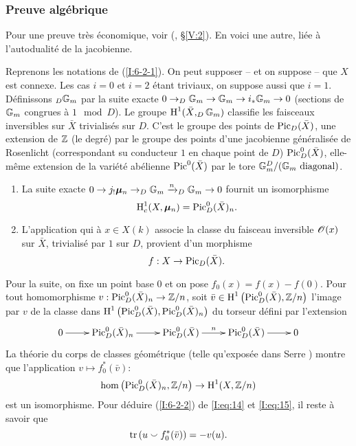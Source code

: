 \documentclass[oneside]{book}
\begin{document}
\subsubsection{Preuve algébrique}\label{I:6-2-3}

Pour une preuve très économique, voir (, \S\ref{V:2}). 
En voici une autre, liée à l'autodualité de la jacobienne. 

Reprenons les notations de (\ref{I:6-2-1}). On peut supposer -- et on suppose -- 
que $X$ est connexe. Les cas $i=0$ et $i=2$ étant triviaux, on suppose aussi 
que $i=1$. Définissons $_D\mathbb{G}_m$ par la suite exacte 
$0\to _D\mathbb{G}_m \to \mathbb{G}_m \to i_*\mathbb{G}_m\to 0$ (sections de $\mathbb{G}_m$ congrues à 
$1\mod D$). Le groupe $\operatorname{H}^1(\bar X, _D\mathbb{G}_m)$ classifie les faisceaux 
inversibles sur $\bar X$ trivialisés sur $D$. C'est le groupe des points de 
$\operatorname{Pic}_D(\bar X)$, une extension de $\mathbb{Z}$ (le degré) par le groupe des points 
d'une jacobienne généralisée de Rosenlicht (correspondant su conducteur 
$1$ en chaque point de $D$) $\operatorname{Pic}_D^0(\bar X)$, elle-même extension de la 
variété abélienne $\operatorname{Pic}^0(\bar X)$ par le tore 
$\mathbb{G}_m^D/(\text{$\mathbb{G}_m$ diagonal})$. 

\begin{enumerate}[\indent a)]
  \item La suite exacte 
    $0\to j_!{\bm\mu}_n \to _D\mathbb{G}_m \xrightarrow{n} _D\mathbb{G}_m\to 0$ fournit un 
    isomorphisme 
    \begin{equation}\label{I:eq:14}
      \operatorname{H}_c^1(X,{\bm\mu}_n) = \operatorname{Pic}_D^0(\bar X)_n \text{.}
    \end{equation}
  \item L'application qui à $x\in X(k)$ associe la classe du faisceau 
    inversible $\mathscr{O}(x)$ sur $\bar X$, trivialisé par $1$ sur $D$, provient 
    d'un morphisme 
    \[
      f:X \to \operatorname{Pic}_D(\bar X) \text{.}
    \]
\end{enumerate}
Pour la suite, on fixe un point base $0$ et on pose $f_0(x)=f(x)-f(0)$. Pour 
tout homomorphisme $v:\operatorname{Pic}_D^0(\bar X)_n \to \mathbb{Z}/n$, soit 
$\bar v\in \operatorname{H}^1\left(\operatorname{Pic}_D^0(\bar X),\mathbb{Z}/n\right)$ l'image par $v$ de la classe 
dans $\operatorname{H}^1\left(\operatorname{Pic}_D^0(\bar X),\operatorname{Pic}_D^0(\bar X)_n\right)$ du torseur défini 
par l'extension 
\[\xymatrix{
  0 \ar[r] 
    & \pic_D^0(\bar X)_n \ar[r] 
    & \pic_D^0(\bar X) \ar[r]^-n 
    & \pic_D^0(\bar X) \ar[r] 
    & 0
}\]
La théorie du corps de classes géométrique (telle qu'exposée dans 
Serre \cite{15}) montre que l'application $v\mapsto f_0^*(\bar v)$: 
\begin{equation}\label{I:eq:15}
  \hom\left(\operatorname{Pic}_D^0(\bar X)_n,\mathbb{Z}/n\right) \to \operatorname{H}^1(X,\mathbb{Z}/n)
\end{equation}
est un isomorphisme. Pour déduire (\ref{I:6-2-2}) de \eqref{I:eq:14} et 
\eqref{I:eq:15}, il reste à savoir que 
\begin{equation}\label{I:eq:16} %
  \tr\left(u \smallsmile f_0^*(\bar v)\right) = -v(u) \text{.}
\end{equation}
\end{document}
